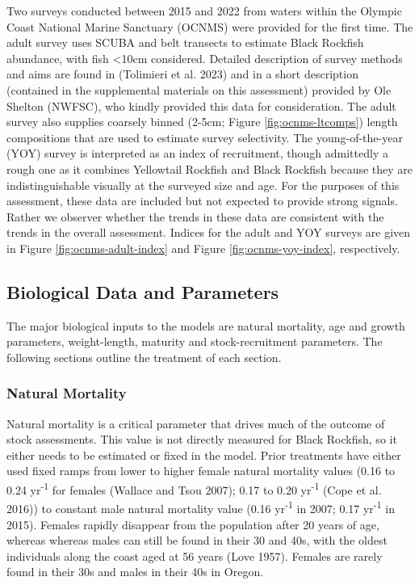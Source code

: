\documentclass[11pt,
  english,
  letterpaper,
]{article}
\begin{document}
Two surveys conducted between 2015 and 2022 from waters within the Olympic Coast National Marine Sanctuary (OCNMS) were provided for the first time. The adult survey uses SCUBA and belt transects to estimate Black Rockfish abundance, with fish \textless10cm considered. Detailed description of survey methods and aims are found in (Tolimieri et al. 2023) and in a short description (contained in the supplemental materials on this assessment) provided by Ole Shelton (NWFSC), who kindly provided this data for consideration. The adult survey also supplies coarsely binned (2-5cm; Figure \ref{fig:ocnms-ltcomps}) length compositions that are used to estimate survey selectivity. The young-of-the-year (YOY) survey is interpreted as an index of recruitment, though admittedly a rough one as it combines Yellowtail Rockfish and Black Rockfish because they are indistinguishable visually at the surveyed size and age. For the purposes of this assessment, these data are included but not expected to provide strong signals. Rather we observer whether the trends in these data are consistent with the trends in the overall assessment. Indices for the adult and YOY surveys are given in Figure \ref{fig:ocnms-adult-index} and Figure \ref{fig:ocnms-yoy-index}, respectively.

\hypertarget{biological-data-and-parameters}{%
\subsection{Biological Data and Parameters}\label{biological-data-and-parameters}}

The major biological inputs to the models are natural mortality, age and growth parameters, weight-length, maturity and stock-recruitment parameters. The following sections outline the treatment of each section.

\hypertarget{natural-mortality}{%
\subsubsection{Natural Mortality}\label{natural-mortality}}

Natural mortality is a critical parameter that drives much of the outcome of stock assessments. This value is not directly measured for Black Rockfish, so it either needs to be estimated or fixed in the model. Prior treatments have either used fixed ramps from lower to higher female natural mortality values (0.16 to 0.24 yr\textsuperscript{-1} for females (Wallace and Tsou 2007); 0.17 to 0.20 yr\textsuperscript{-1} (Cope et al. 2016)) to constant male natural mortality value (0.16 yr\textsuperscript{-1} in 2007; 0.17 yr\textsuperscript{-1} in 2015). Females rapidly disappear from the population after 20 years of age, whereas whereas males can still be found in their 30 and 40s, with the oldest individuals along the coast aged at 56 years (Love 1957). Females are rarely found in their 30s and males in their 40s in Oregon.
\end{document}
